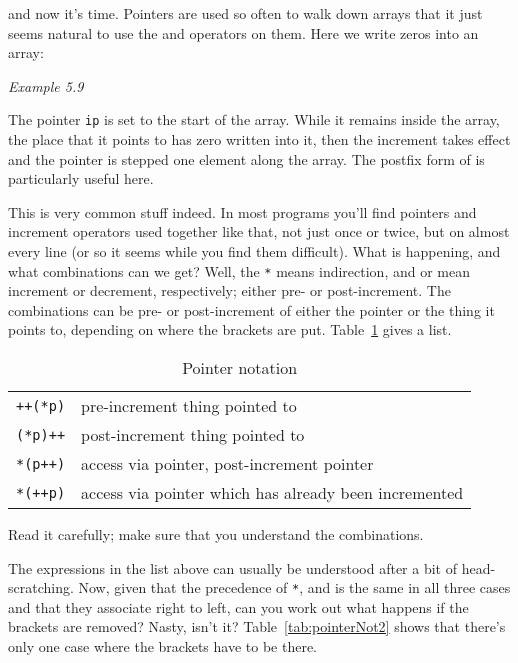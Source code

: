    and now it's time. Pointers are used so often to walk down arrays that
    it just seems natural to use the \pp{} and \mm{}
    operators on them. Here we write zeros into an array:


    \begin{center}\textit{Example 5.9}\end{center}


   The pointer \texttt{ip} is set to the start of the array. While it
    remains inside the array, the place that it points to has zero written
    into it, then the increment takes effect and the pointer is stepped one
    element along the array. The postfix form of \pp{} is
    particularly useful here.


   This is very common stuff indeed. In most programs you'll find
    pointers and increment operators used together like that, not just once
    or twice, but on almost every line (or so it seems while you find them
    difficult). What is happening, and what combinations can we get? Well,
    the \texttt{*} means indirection, and \pp{} or
    \mm{} mean increment or decrement, respectively;
    either pre- or post-increment.
    The combinations can be pre- or post-increment
    of either the pointer or the thing it points to,
    depending on where the brackets are put.
    Table~\ref{tab:pointerNot} gives a list.


    \begin{table}[htb]
      \centering
      \begin{tabular}{ll}
        \toprule
        \texttt{++(*p)} & pre-increment thing pointed to    \\
        \texttt{(*p)++} & post-increment thing pointed to    \\
        \texttt{*(p++)} & access via pointer, post-increment pointer    \\
        \texttt{*(++p)} & access via pointer which has already been incremented \\
        \bottomrule
      \end{tabular}
      \caption{\label{tab:pointerNot}Pointer notation}
    \end{table}



   Read it carefully; make sure that you understand the combinations.


   The expressions in the list above can usually be understood after
    a bit of head-scratching. Now, given that the precedence of
    \texttt{*}, \pp{} and \mm{} is the same in all
    three cases and that they associate right to left, can you work out what
    happens if the brackets are removed?
    Nasty, isn't it?
    Table~\ref{tab:pointerNot2} shows that there's only one case where the brackets have to
    be there.


